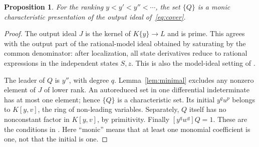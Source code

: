 \documentclass[10pt,a4paper]{article}
\newtheorem{proposition}[theorem]{Proposition}
\theoremstyle{definition}\newtheorem{definition}[theorem]{Definition}
\newcommand{\coef}[1]{[#1]Q}
\begin{document}
\begin{proposition}
\label{prop:characteristic}
For the ranking $y<y'<y''<\cdots$, the set $\{Q\}$ is a monic
characteristic presentation of the output ideal of~\eqref{eq:cover}.
\end{proposition}
\begin{proof}
The output ideal $J$ is the kernel of $K\{y\}\to L$ and is prime.
This agrees with the output part of the rational-model ideal obtained
by saturating by the common denominator: after localization, all
state derivatives reduce to rational expressions in the independent
states $S,z$. This is also the model-ideal setting of
\cite[Lemma~3.2]{HOPY}.

The leader of $Q$ is $y''$, with degree $q$. Lemma~\ref{lem:minimal}
excludes any nonzero element of $J$ of lower rank. An autoreduced set
in one differential indeterminate has at most one element; hence
$\{Q\}$ is a characteristic set. Its initial $y^q u^p$ belongs to
$K[y,v]$, the ring of non-leading variables. Separately, $Q$ itself
has no nonconstant factor in $K[y,v]$, by primitivity.
Finally $\coef{y^q w^q}=1$. These are the conditions in
\cite[Definition~5.4]{OPT}. Here ``monic'' means that at least one
monomial coefficient is one, not that the initial is one.
\end{proof}
\end{document}
